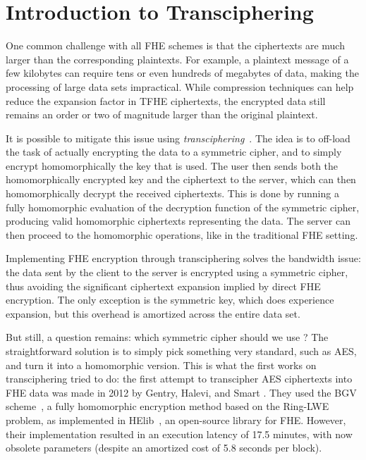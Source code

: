 \section{Introduction to Transciphering}
\label{sec:transciphering}


One common challenge with all FHE schemes is that the ciphertexts are much larger than the corresponding plaintexts. 
For example, a plaintext message of a few kilobytes can require tens or even hundreds of megabytes of data, making the processing of large data sets impractical. While compression techniques can help reduce the expansion factor in TFHE ciphertexts, the encrypted data still remains an order or two of magnitude larger than the original plaintext. 

It is possible to mitigate this issue using \emph{transciphering}~\cite{transciphering}. The idea is to off-load the task of actually encrypting the data to a symmetric cipher, and to simply encrypt homomorphically the key that is used. The user then sends both the homomorphically encrypted key and the ciphertext to the server, which can then homomorphically decrypt the received ciphertexts. This is done by running a fully homomorphic evaluation of the decryption function of the symmetric cipher, producing valid homomorphic ciphertexts representing the data. The server can then proceed to the homomorphic operations, like in the traditional FHE setting.



Implementing FHE encryption through transciphering solves the bandwidth issue: the data sent by the client to the server is encrypted using a symmetric cipher, thus avoiding the significant ciphertext 
expansion implied by direct FHE encryption. The only exception is the symmetric key, which does experience expansion, but this overhead is amortized across the entire data set.

But still, a question remains: which symmetric cipher should we use ? The straightforward solution is to simply pick something very standard, such as AES, and turn it into a homomorphic version. This is what the first works on transciphering tried to do: the first attempt to transcipher AES ciphertexts into FHE data was made in 2012 by Gentry, Halevi, and Smart \cite{C:GenHalSma12}. They used the BGV scheme~\cite{ITCS:BraGenVai12}, a fully homomorphic encryption method based on the Ring-LWE problem, as implemented in HElib~\cite{EPRINT:HalSho20}, an open-source library for FHE. However, their implementation resulted in an execution latency of 17.5 minutes, with now obsolete parameters (despite an amortized cost of 5.8 seconds per block).

